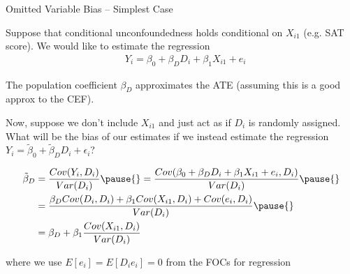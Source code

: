 \documentclass[11pt,english,handout]{beamer}
\newenvironment{wideitemize}{\itemize\addtolength{\itemsep}{10pt}}{\enditemize}
\begin{document}
\begin{frame}{Omitted Variable Bias -- Simplest Case}
\begin{wideitemize}
	\item
	Suppose that conditional unconfoundedness holds conditional on $X_{i1}$ (e.g. SAT score). \pause{} 
	We would like to estimate the regression
	\begin{align*}
		& Y_i = \beta_0 + \beta_{D} D_i + \beta_{1} X_{i1}+e_i
	\end{align*}

	\noindent 
	The population coefficient $\beta_{D}$ approximates the ATE (assuming this is a good approx to the CEF).
	
	\item
	Now, suppose we don't include $X_{i1}$ and just act as if $D_i$ is randomly assigned. \pause
	What will be the bias of our estimates if we instead estimate the regression $Y_i = \tilde\beta_0 + \tilde\beta_{D} D_i + \epsilon_i$?
	
	\pause
	\begin{align*}
		\tilde\beta_D&=\frac{Cov(Y_i,D_i)}{Var(D_i)} \pause{}=\frac{Cov( \beta_0 + \beta_{D} D_i + \beta_{1} X_{i1}+e_i,D_i)}{Var(D_i)} \pause{}\\
&=\frac{\beta_{D}Cov( D_i,D_i) + \beta_{1} Cov(X_{i1},D_i)+Cov(e_i,D_i)}{Var(D_i)} \pause{}\\
&=\beta_D+\beta_1\frac{Cov(X_{i1},D_i)}{Var(D_i)}
	\end{align*}

\noindent where we use $E[e_i] = E[D_i e_i] = 0$ from the FOCs for regression
\end{wideitemize}	
	
\end{frame}
\end{document}
